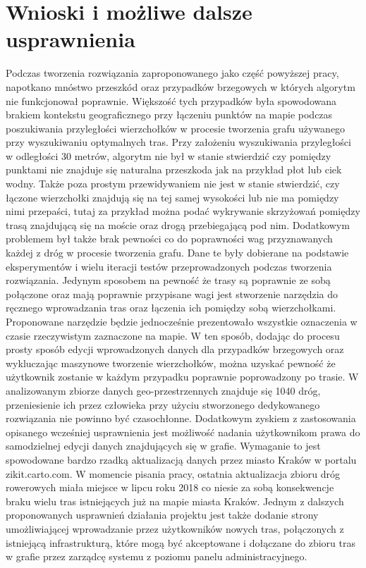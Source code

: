 \chapter{Wnioski i możliwe dalsze usprawnienia}
\label{cha:wnioski}

Podczas tworzenia rozwiązania zaproponowanego jako część powyższej pracy, napotkano mnóstwo przeszkód oraz przypadków brzegowych w których algorytm nie funkcjonował poprawnie. Większość tych przypadków była spowodowana brakiem kontekstu geograficznego przy łączeniu punktów na mapie podczas poszukiwania przyległości wierzchołków w procesie tworzenia grafu używanego przy wyszukiwaniu optymalnych tras. Przy założeniu wyszukiwania przyległości w odległości 30 metrów, algorytm nie był w stanie stwierdzić czy pomiędzy punktami nie znajduje się naturalna przeszkoda jak na przykład płot lub ciek wodny. Także poza prostym przewidywaniem nie jest w stanie stwierdzić, czy łączone wierzchołki znajdują się na tej samej wysokości lub nie ma pomiędzy nimi przepaści, tutaj za przykład można podać wykrywanie skrzyżowań pomiędzy trasą znajdującą się na moście oraz drogą przebiegającą pod nim. Dodatkowym problemem był także brak pewności co do poprawności wag przyznawanych każdej z dróg w procesie tworzenia grafu. Dane te były dobierane na podstawie eksperymentów i wielu iteracji testów przeprowadzonych podczas tworzenia rozwiązania. \newline
Jedynym sposobem na pewność że trasy są poprawnie ze sobą połączone oraz mają poprawnie przypisane wagi jest stworzenie narzędzia do ręcznego wprowadzania tras oraz łączenia ich pomiędzy sobą wierzchołkami. Proponowane narzędzie będzie jednocześnie prezentowało wszystkie oznaczenia w czasie rzeczywistym zaznaczone na mapie. W ten sposób, dodając do procesu prosty sposób edycji wprowadzonych danych dla przypadków brzegowych oraz wykluczając maszynowe tworzenie wierzchołków, można uzyskać pewność że użytkownik zostanie w każdym przypadku poprawnie poprowadzony po trasie. W analizowanym zbiorze danych geo-przestrzennych znajduje się 1040 dróg, przeniesienie ich przez człowieka przy użyciu stworzonego dedykowanego rozwiązania nie powinno być czasochłonne. \newline
Dodatkowym zyskiem z zastosowania opisanego wcześniej usprawnienia jest możliwość nadania użytkownikom prawa do samodzielnej edycji danych znajdujących się w grafie. Wymaganie to jest spowodowane bardzo rzadką aktualizacją danych przez miasto Kraków w portalu zikit.carto.com. W momencie pisania pracy, ostatnia aktualizacja zbioru dróg rowerowych miała miejsce w lipcu roku 2018 co niesie za sobą konsekwencje braku wielu tras istniejących już na mapie miasta Kraków. Jednym z dalszych proponowanych usprawnień działania projektu jest także dodanie strony umożliwiającej wprowadzanie przez użytkowników nowych tras, połączonych z istniejącą infrastrukturą, które mogą być akceptowane i dołączane do zbioru tras w grafie przez zarządcę systemu z poziomu panelu administracyjnego. \newline
